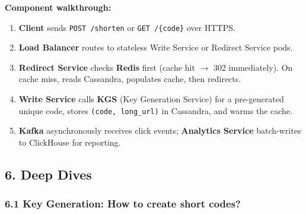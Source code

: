 \documentclass[11pt]{article}
\providecommand{\tightlist}{\setlength{\itemsep}{1pt}\setlength{\parskip}{0pt}}
\begin{document}
\textbf{Component walkthrough:}

\begin{enumerate}
\def\labelenumi{\arabic{enumi}.}
\tightlist
\item
  \textbf{Client} sends \texttt{POST\ /shorten} or \texttt{GET\ /\{code\}} over HTTPS.
\item
  \textbf{Load Balancer} routes to stateless Write Service or Redirect Service pods.
\item
  \textbf{Redirect Service} checks \textbf{Redis} first (cache hit \(\rightarrow\) 302 immediately). On cache miss, reads Cassandra, populates cache, then redirects.
\item
  \textbf{Write Service} calls \textbf{KGS} (Key Generation Service) for a pre-generated unique code, stores \texttt{(code,\ long\_url)} in Cassandra, and warms the cache.
\item
  \textbf{Kafka} asynchronously receives click events; \textbf{Analytics Service} batch-writes to ClickHouse for reporting.
\end{enumerate}

\subsection{6. Deep Dives}\label{6-deep-dives}

\subsubsection{6.1 Key Generation: How to create short codes?}\label{61-key-generation-how-to-create-short-codes}
\end{document}
